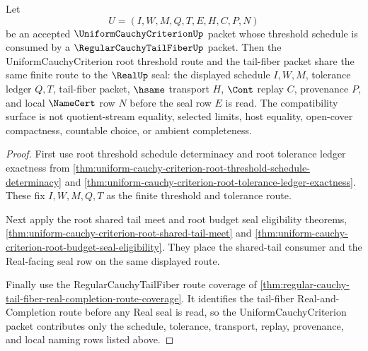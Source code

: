 \begin{theorem}
\label{thm:uniform-cauchy-criterion-tail-fiber-seal-compatibility}
Let
$$
U=(I,W,M,Q,T,E,H,C,P,N)
$$
be an accepted $\UniformCauchyCriterionUp$ packet whose threshold schedule is consumed by a $\RegularCauchyTailFiberUp$ packet. Then the UniformCauchyCriterion root threshold route and the tail-fiber packet share the same finite route to the $\RealUp$ seal: the displayed schedule $I,W,M$, tolerance ledger $Q,T$, tail-fiber packet, $\hsame$ transport $H$, $\Cont$ replay $C$, provenance $P$, and local $\NameCert$ row $N$ before the seal row $E$ is read. The compatibility surface is not quotient-stream equality, selected limits, host equality, open-cover compactness, countable choice, or ambient completeness.
\end{theorem}
\begin{proof}
First use root threshold schedule determinacy and root tolerance ledger exactness from \autoref{thm:uniform-cauchy-criterion-root-threshold-schedule-determinacy} and \autoref{thm:uniform-cauchy-criterion-root-tolerance-ledger-exactness}. These fix $I,W,M,Q,T$ as the finite threshold and tolerance route.

Next apply the root shared tail meet and root budget seal eligibility theorems, \autoref{thm:uniform-cauchy-criterion-root-shared-tail-meet} and \autoref{thm:uniform-cauchy-criterion-root-budget-seal-eligibility}. They place the shared-tail consumer and the Real-facing seal row on the same displayed route.

Finally use the RegularCauchyTailFiber route coverage of \autoref{thm:regular-cauchy-tail-fiber-real-completion-route-coverage}. It identifies the tail-fiber Real-and-Completion route before any Real seal is read, so the UniformCauchyCriterion packet contributes only the schedule, tolerance, transport, replay, provenance, and local naming rows listed above.
\end{proof}

